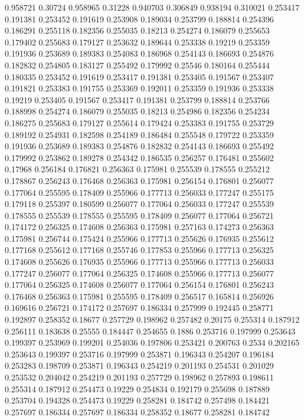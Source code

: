 0.958721 0.30724
0.958965 0.31228
0.940703 0.306849
0.938194 0.310021
0.253417 0.191381
0.253452 0.191619
0.253908 0.189034
0.253799 0.188814
0.254396 0.186291
0.255118 0.182356
0.255035 0.18213
0.254274 0.186079
0.255653 0.179402
0.255683 0.179127
0.253632 0.189644
0.253338 0.19219
0.253359 0.191936
0.253689 0.189383
0.254083 0.186968
0.254143 0.186693
0.254876 0.182832
0.254805 0.183127
0.255492 0.179992
0.25546 0.180164
0.255444 0.180335
0.253452 0.191619
0.253417 0.191381
0.253405 0.191567
0.253407 0.191821
0.253383 0.191755
0.253369 0.192011
0.253359 0.191936
0.253338 0.19219
0.253405 0.191567
0.253417 0.191381
0.253799 0.188814
0.253766 0.188998
0.254274 0.186079
0.255035 0.18213
0.254986 0.182356
0.254234 0.186275
0.255683 0.179127
0.255614 0.179424
0.253383 0.191755
0.253729 0.189192
0.254931 0.182598
0.254189 0.186484
0.255548 0.179722
0.253359 0.191936
0.253689 0.189383
0.254876 0.182832
0.254143 0.186693
0.255492 0.179992
0.253862 0.189278
0.254342 0.186535
0.256257 0.176481
0.255602 0.17968
0.256184 0.176821
0.256363 0.175981
0.255539 0.178555
0.255212 0.178867
0.256243 0.176468
0.256363 0.175981
0.256154 0.176801
0.256077 0.177064
0.255595 0.178409
0.255966 0.177713
0.256033 0.177247
0.255175 0.179118
0.255397 0.180599
0.256077 0.177064
0.256033 0.177247
0.255539 0.178555
0.255539 0.178555
0.255595 0.178409
0.256077 0.177064
0.256721 0.174172
0.256325 0.174608
0.256363 0.175981
0.257163 0.174273
0.256363 0.175981
0.256744 0.175424
0.255966 0.177713
0.255626 0.176935
0.255612 0.177168
0.255612 0.177168
0.255746 0.177853
0.255966 0.177713
0.256325 0.174608
0.255626 0.176935
0.255966 0.177713
0.255966 0.177713
0.256033 0.177247
0.256077 0.177064
0.256325 0.174608
0.255966 0.177713
0.256077 0.177064
0.256325 0.174608
0.256077 0.177064
0.256154 0.176801
0.256243 0.176468
0.256363 0.175981
0.255595 0.178409
0.256517 0.165814
0.256926 0.169616
0.256721 0.174172
0.257697 0.186334
0.257999 0.192445
0.258771 0.192897
0.258352 0.18677
0.257729 0.198962
0.257482 0.20175
0.255314 0.187912
0.256111 0.183638
0.25555 0.184447
0.254655 0.1886
0.253716 0.197999
0.253643 0.199397
0.253969 0.199201
0.254036 0.197806
0.253421 0.200763
0.2534 0.202165
0.253643 0.199397
0.253716 0.197999
0.253871 0.196343
0.254207 0.196184
0.253283 0.198709
0.253871 0.196343
0.254219 0.201193
0.254531 0.201029
0.253532 0.204042
0.254219 0.201193
0.257729 0.198962
0.257893 0.198611
0.255314 0.187912
0.254473 0.19229
0.254834 0.192179
0.255698 0.187889
0.253704 0.194328
0.254473 0.19229
0.258281 0.184742
0.257498 0.184421
0.257697 0.186334
0.257697 0.186334
0.258352 0.18677
0.258281 0.184742
